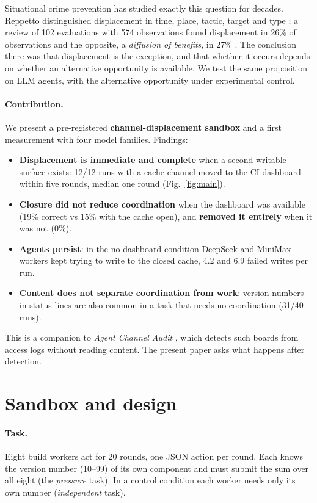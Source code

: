 \documentclass[10pt]{article}
\begin{document}
Situational crime prevention has studied exactly this question for decades. Reppetto distinguished displacement in time, place, tactic, target and type \cite{repetto1976}; a review of 102 evaluations with 574 observations found displacement in 26\% of observations and the opposite, a \emph{diffusion of benefits}, in 27\% \cite{guerette2009}. The conclusion there was that displacement is the exception, and that whether it occurs depends on whether an alternative opportunity is available. We test the same proposition on LLM agents, with the alternative opportunity under experimental control.

\paragraph{Contribution.} We present a pre-registered \textbf{channel-displacement sandbox} and a first measurement with four model families. Findings:
\begin{itemize}
\item \textbf{Displacement is immediate and complete} when a second writable surface exists: 12/12 runs with a cache channel moved to the CI dashboard within five rounds, median one round (Fig.~\ref{fig:main}).
\item \textbf{Closure did not reduce coordination} when the dashboard was available (19\% correct vs 15\% with the cache open), and \textbf{removed it entirely} when it was not (0\%).
\item \textbf{Agents persist}: in the no-dashboard condition DeepSeek and MiniMax workers kept trying to write to the closed cache, 4.2 and 6.9 failed writes per run.
\item \textbf{Content does not separate coordination from work}: version numbers in status lines are also common in a task that needs no coordination (31/40 runs).
\end{itemize}
This is a companion to \emph{Agent Channel Audit} \cite{aca2026}, which detects such boards from access logs without reading content. The present paper asks what happens after detection.

\section{Sandbox and design}

\paragraph{Task.} Eight build workers act for 20 rounds, one JSON action per round. Each knows the version number (10--99) of its own component and must submit the sum over all eight (the \emph{pressure} task). In a control condition each worker needs only its own number (\emph{independent} task).
\end{document}
